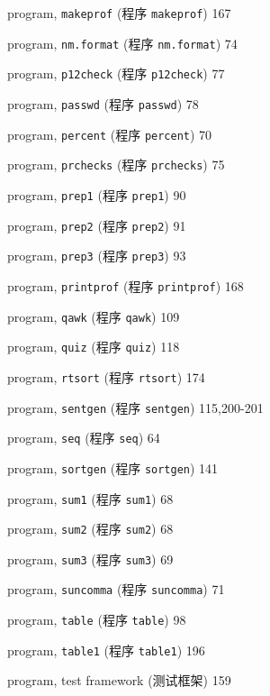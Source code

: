\begin{multicols}{2}
\hangindent=2pc  program, \verb'makeprof' (程序 \verb'makeprof') 167

\hangindent=2pc  program, \verb'nm.format' (程序 \verb'nm.format')
74

\hangindent=2pc  program, \verb'p12check' (程序 \verb'p12check') 77

\hangindent=2pc  program, \verb'passwd' (程序 \verb'passwd') 78

\hangindent=2pc  program, \verb'percent' (程序 \verb'percent') 70

\hangindent=2pc  program, \verb'prchecks' (程序 \verb'prchecks') 75

\hangindent=2pc  program, \verb'prep1' (程序 \verb'prep1') 90

\hangindent=2pc  program, \verb'prep2' (程序 \verb'prep2') 91

\hangindent=2pc  program, \verb'prep3' (程序 \verb'prep3') 93

\hangindent=2pc  program, \verb'printprof' (程序
\verb'printprof') 168

\hangindent=2pc  program, \verb'qawk' (程序 \verb'qawk') 109

\hangindent=2pc  program, \verb'quiz'  (程序 \verb'quiz') 118

\hangindent=2pc  program, \verb'rtsort'  (程序 \verb'rtsort') 174

\hangindent=2pc  program, \verb'sentgen'  (程序 \verb'sentgen')
115,200-201

\hangindent=2pc  program, \verb'seq'  (程序 \verb'seq') 64

\hangindent=2pc  program, \verb'sortgen'  (程序 \verb'sortgen') 141

\hangindent=2pc  program, \verb'sum1'  (程序 \verb'sum1') 68

\hangindent=2pc  program, \verb'sum2'  (程序 \verb'sum2') 68

\hangindent=2pc  program, \verb'sum3'  (程序 \verb'sum3') 69

\hangindent=2pc  program, \verb'suncomma' (程序 \verb'suncomma') 71

\hangindent=2pc  program, \verb'table' (程序 \verb'table') 98

\hangindent=2pc  program, \verb'table1' (程序 \verb'table1') 196

\hangindent=2pc  program, test framework (测试框架) 159


\end{multicols}
